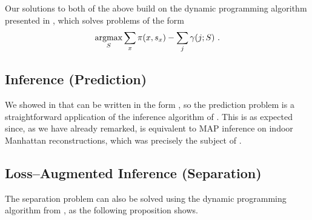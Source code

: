 Our solutions to both of the above build on the dynamic programming
algorithm presented in , which solves problems of
the form
\begin{equation}
  \argmax_{\Seam}\limits
    \sum_x \PixelPayoff(x,\seam_x) - \sum_j \CornerPenalty(j;\Seam) ~.
  \label{eq:inference-problem}
\end{equation}

\subsection{Inference (Prediction)}

We showed in  that  can be
written in the form , so the prediction
problem is a straightforward application of the inference algorithm of
. This is as expected since, as we have already
remarked,  is equivalent to MAP inference on
indoor Manhattan reconstructions, which was precisely the subject of
.

\subsection{Loss--Augmented Inference (Separation)}

The separation problem can also be solved using the
dynamic programming algorithm from , as the
following proposition shows.

